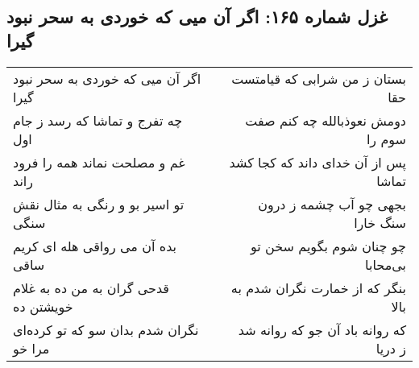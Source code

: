\begin{center}
\section*{غزل شماره ۱۶۵: اگر آن میی که خوردی به سحر نبود گیرا}
\label{sec:0165}
\begin{longtable}{l p{0.5cm} r}
اگر آن میی که خوردی به سحر نبود گیرا
&&
بستان ز من شرابی که قیامتست حقا
\\
چه تفرج و تماشا که رسد ز جام اول
&&
دومش نعوذبالله چه کنم صفت سوم را
\\
غم و مصلحت نماند همه را فرود راند
&&
پس از آن خدای داند که کجا کشد تماشا
\\
تو اسیر بو و رنگی به مثال نقش سنگی
&&
بجهی چو آب چشمه ز درون سنگ خارا
\\
بده آن می رواقی هله ای کریم ساقی
&&
چو چنان شوم بگویم سخن تو بی‌محابا
\\
قدحی گران به من ده به غلام خویشتن ده
&&
بنگر که از خمارت نگران شدم به بالا
\\
نگران شدم بدان سو که تو کرده‌ای مرا خو
&&
که روانه باد آن جو که روانه شد ز دریا
\\
\end{longtable}
\end{center}
